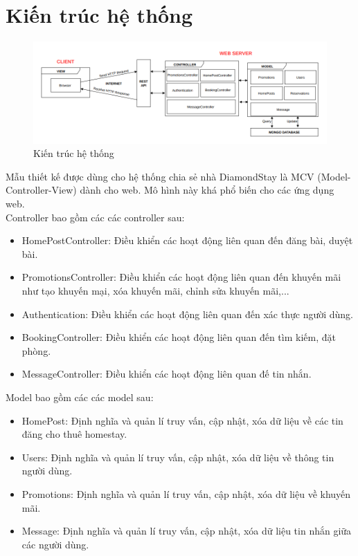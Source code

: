 \newpage 
\section{Kiến trúc hệ thống}
\begin{figure}[H]
	\centering
	\includegraphics[width=14cm]{Image/ar.png}
	\vspace{0.5cm}
	\caption{Kiến trúc hệ thống}
\end{figure}

Mẫu thiết kế được dùng cho hệ thống chia sẻ nhà DiamondStay là MCV (Model-Controller-View) dành cho web. Mô hình này khá phổ biến cho các ứng dụng web. \\
Controller bao gồm các các controller sau:
\begin{itemize}
    \item HomePostController: Điều khiển các hoạt động liên quan đến đăng bài, duyệt bài.
    \item PromotionsController: Điều khiển các hoạt động liên quan đến khuyến mãi như tạo khuyến mại, xóa khuyến mãi, chỉnh sửa khuyến mãi,...
    \item Authentication: Điều khiển các hoạt động liên quan đến xác thực người dùng.
    \item BookingController: Điều khiển các hoạt động liên quan đến tìm kiếm, đặt phòng.
    \item MessageController: Điều khiển các hoạt động liên quan đế tin nhắn.
\end{itemize}

Model bao gồm các các model sau:
\begin{itemize}
    \item HomePost: Định nghĩa và quản lí truy vấn, cập nhật, xóa dữ liệu về các tin đăng cho thuê homestay.
    \item Users: Định nghĩa và quản lí truy vấn, cập nhật, xóa dữ liệu về thông tin người dùng.
    \item Promotions: Định nghĩa và quản lí truy vấn, cập nhật, xóa dữ liệu về khuyến mãi.
    \item Message: Định nghĩa và quản lí truy vấn, cập nhật, xóa dữ liệu tin nhắn giữa các người dùng.
\end{itemize}